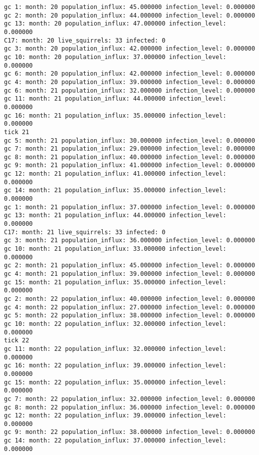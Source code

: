 \begin{lstlisting}[basicstyle=\small]
gc 1: month: 20 population_influx: 45.000000 infection_level: 0.000000
gc 2: month: 20 population_influx: 44.000000 infection_level: 0.000000
gc 13: month: 20 population_influx: 47.000000 infection_level: 0.000000
C17: month: 20 live_squirrels: 33 infected: 0
gc 3: month: 20 population_influx: 42.000000 infection_level: 0.000000
gc 10: month: 20 population_influx: 37.000000 infection_level: 0.000000
gc 6: month: 20 population_influx: 42.000000 infection_level: 0.000000
gc 4: month: 20 population_influx: 39.000000 infection_level: 0.000000
gc 6: month: 21 population_influx: 32.000000 infection_level: 0.000000
gc 11: month: 21 population_influx: 44.000000 infection_level: 0.000000
gc 16: month: 21 population_influx: 35.000000 infection_level: 0.000000
tick 21
gc 5: month: 21 population_influx: 30.000000 infection_level: 0.000000
gc 7: month: 21 population_influx: 29.000000 infection_level: 0.000000
gc 8: month: 21 population_influx: 40.000000 infection_level: 0.000000
gc 9: month: 21 population_influx: 41.000000 infection_level: 0.000000
gc 12: month: 21 population_influx: 41.000000 infection_level: 0.000000
gc 14: month: 21 population_influx: 35.000000 infection_level: 0.000000
gc 1: month: 21 population_influx: 37.000000 infection_level: 0.000000
gc 13: month: 21 population_influx: 44.000000 infection_level: 0.000000
C17: month: 21 live_squirrels: 33 infected: 0
gc 3: month: 21 population_influx: 36.000000 infection_level: 0.000000
gc 10: month: 21 population_influx: 33.000000 infection_level: 0.000000
gc 2: month: 21 population_influx: 45.000000 infection_level: 0.000000
gc 4: month: 21 population_influx: 39.000000 infection_level: 0.000000
gc 15: month: 21 population_influx: 35.000000 infection_level: 0.000000
gc 2: month: 22 population_influx: 40.000000 infection_level: 0.000000
gc 4: month: 22 population_influx: 27.000000 infection_level: 0.000000
gc 5: month: 22 population_influx: 38.000000 infection_level: 0.000000
gc 10: month: 22 population_influx: 32.000000 infection_level: 0.000000
tick 22
gc 11: month: 22 population_influx: 32.000000 infection_level: 0.000000
gc 16: month: 22 population_influx: 39.000000 infection_level: 0.000000
gc 15: month: 22 population_influx: 35.000000 infection_level: 0.000000
gc 7: month: 22 population_influx: 32.000000 infection_level: 0.000000
gc 8: month: 22 population_influx: 36.000000 infection_level: 0.000000
gc 12: month: 22 population_influx: 39.000000 infection_level: 0.000000
gc 9: month: 22 population_influx: 38.000000 infection_level: 0.000000
gc 14: month: 22 population_influx: 37.000000 infection_level: 0.000000

\end{lstlisting}

